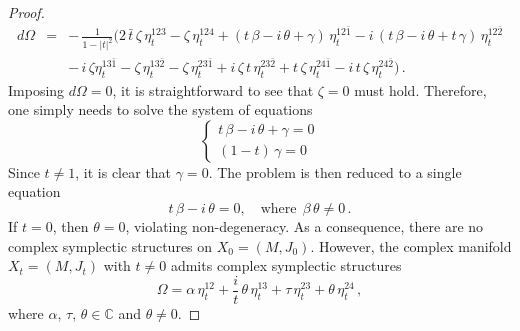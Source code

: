 \documentclass[10pt,a4paper]{amsart}
\begin{document}
\begin{proof}
\[\begin{array}{lcl}
d\Omega &=& -\,\frac{1}{1-|t|^2}\Big( 2\,\bar t\,\zeta\,\eta_t^{123} - \zeta\,\eta_t^{124} +
  (t\,\beta-i\,\theta+\gamma)\,\eta_t^{12\bar1} - i\,(t\,\beta-i\,\theta+t\,\gamma)\,\eta_t^{12\bar2}\\
&& -\,i\,\zeta\eta_t^{13\bar1}-\zeta\,\eta_t^{13\bar2}-\zeta\,\eta_t^{23\bar1}+i\,\zeta\,t\,\eta_t^{23\bar2}
  +t\,\zeta\,\eta_t^{24\bar1}-i\,t\,\zeta\,\eta_t^{24\bar2}\Big)\,.
\end{array}
\]
Imposing $d\Omega=0$, it is straightforward to see that $\zeta=0$ must hold. Therefore, one simply needs to solve the system of equations
\[
\begin{cases}
t\,\beta-i\,\theta+\gamma=0\\
(1-t)\,\gamma=0
\end{cases}
\]
Since $t\neq 1$, it is clear that $\gamma=0$. The problem is then reduced to a single equation
\[
t\,\beta-i\,\theta=0,\quad \text{where}\ \ \beta\,\theta\neq 0\,.
\]
If $t=0$, then $\theta=0$, violating non-degeneracy. As a consequence, there are no complex symplectic structures on $X_{0}=(M,J_{0})$. However, the complex manifold $X_{t}=(M,J_{t})$ with $t\neq 0$  admits complex symplectic structures
\[
\Omega=\alpha\,\eta_t^{12}+\frac it\,\theta\,\eta_t^{13}+\tau\,\eta_t^{23}+\theta\,\eta_t^{24}\,,
\]
where $\alpha,\,\tau,\,\theta\in\mathbb C$ and $\theta\neq 0$.
\end{proof}
\end{document}
